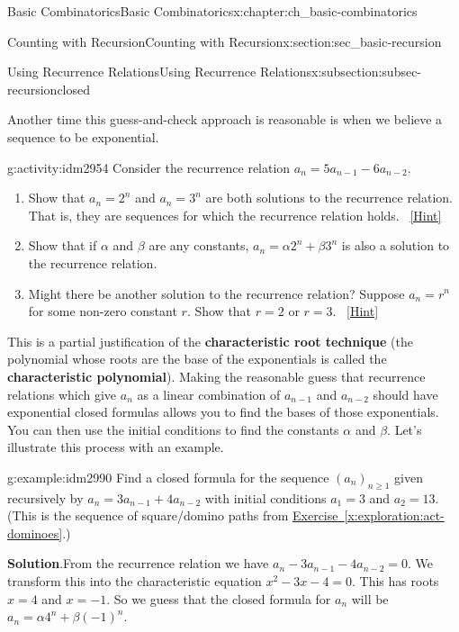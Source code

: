 \documentclass[oneside,10pt,]{book}
\newcommand{\terminology}[1]{\textbf{#1}}
\numberwithin{equation}{chapter}
\begin{document}
\begin{chapterptx}{Basic Combinatorics}{}{Basic Combinatorics}{}{}{x:chapter:ch_basic-combinatorics}
\begin{sectionptx}{Counting with Recursion}{}{Counting with Recursion}{}{}{x:section:sec_basic-recursion}
\begin{subsectionptx}{Using Recurrence Relations}{}{Using Recurrence Relations}{}{}{x:subsection:subsec-recursionclosed}
\par
Another time this guess-and-check approach is reasonable is when we believe a sequence to be exponential.%
\begin{activity}{}{g:activity:idm2954}%
Consider the recurrence relation \(a_n = 5a_{n-1} - 6a_{n-2}\).%
\begin{enumerate}[font=\bfseries,label=(\alph*),ref=\alph*]
\item{}Show that \(a_n = 2^n\) and \(a_n = 3^n\) are both solutions to the recurrence relation.  That is, they are sequences for which the recurrence relation holds.%
\qquad~\hfill{\tiny\hyperlink{g:hint:idm2963-back}{[Hint]}}\item{}Show that if \(\alpha\) and \(\beta\) are any constants, \(a_n = \alpha 2^n + \beta 3^n\) is also a solution to the recurrence relation.%
\item{}Might there be another solution to the recurrence relation?  Suppose \(a_n = r^n\) for some non-zero constant \(r\).  Show that \(r = 2\) or \(r = 3\).%
\qquad~\hfill{\tiny\hyperlink{g:hint:idm2978-back}{[Hint]}}\end{enumerate}
\end{activity}
This is a partial justification of the \terminology{characteristic root technique} (the polynomial whose roots are the base of the exponentials is called the \terminology{characteristic polynomial}).  Making the reasonable guess that recurrence relations which give \(a_n\) as a linear combination of \(a_{n-1}\) and \(a_{n-2}\) should have exponential closed formulas allows you to find the bases of those exponentials.  You can then use the initial conditions to find the constants \(\alpha\) and \(\beta\).  Let's illustrate this process with an example.%
\begin{example}{}{g:example:idm2990}%
Find a closed formula for the sequence \((a_n)_{n \ge 1}\) given recursively by \(a_n = 3a_{n-1} + 4a_{n-2}\) with initial conditions \(a_1 = 3\) and \(a_2 = 13\).  (This is the sequence of square\slash{}domino paths from \hyperref[x:exploration:act-dominoes]{Exercise~\ref{x:exploration:act-dominoes}}.)%
\par\smallskip%
\noindent\textbf{Solution}.\hypertarget{g:solution:idm2998}{}\quad{}From the recurrence relation we have \(a_n - 3a_{n-1} - 4a_{n-2} = 0\).  We transform this into the characteristic equation \(x^2 - 3x - 4 = 0\). This has roots \(x = 4\) and \(x = -1\).  So we guess that the closed formula for \(a_n\) will be \(a_n = \alpha 4^n + \beta (-1)^n\).%
\par

\end{example}
\end{subsectionptx}
\end{sectionptx}
\end{chapterptx}
\end{document}

